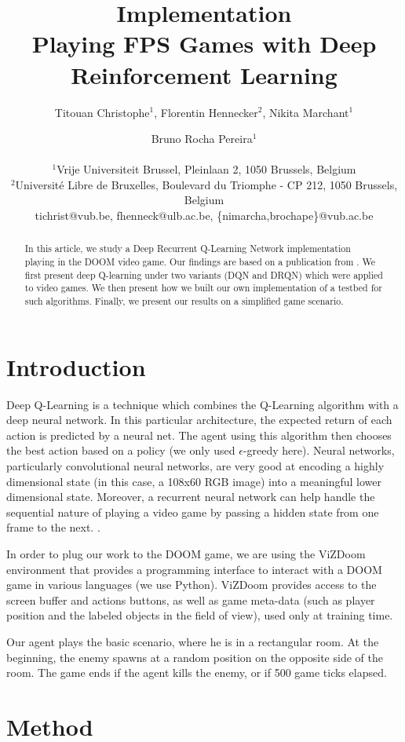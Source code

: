 \documentclass[letterpaper]{article}
\title{Implementation\\Playing FPS Games with Deep Reinforcement Learning}
\author{Titouan Christophe$^{1}$, Florentin Hennecker$^{2}$, Nikita Marchant$^{1}$ \and Bruno Rocha Pereira$^{1}$ \\
\mbox{}\\
$^1$Vrije Universiteit Brussel, Pleinlaan 2, 1050 Brussels, Belgium \\
$^2$Universit\'e Libre de Bruxelles, Boulevard du Triomphe - CP 212, 1050
Brussels, Belgium \\
tichrist@vub.be, fhenneck@ulb.ac.be, \{nimarcha,brochape\}@vub.ac.be}
\begin{document}
\maketitle

\begin{abstract}
In this article, we study a Deep Recurrent Q-Learning Network implementation
playing in the DOOM video game. Our findings are based on a publication from
\cite{Lample2016}. We first present deep Q-learning under two variants (DQN and
DRQN) which were applied to video games. We then present how we built our own
implementation of a testbed for such algorithms. Finally, we present our results
on a simplified game scenario.
\end{abstract}

\section{Introduction}
Deep Q-Learning is a technique which combines the Q-Learning algorithm with
a deep neural network. In this particular architecture, the expected return of
each action is predicted by a neural net. The agent using this algorithm then
chooses the best action based on a policy (we only used $\epsilon$-greedy here).
Neural networks, particularly convolutional neural networks, are very good at
encoding a highly dimensional state (in this case, a 108x60 RGB image) into a
meaningful lower dimensional state. Moreover, a recurrent neural network can
help handle the sequential nature of playing a video game by passing a hidden
state from one frame to the next.
.

In order to plug our work to the DOOM game, we are using the ViZDoom environment
\citep{Kempka2016} that provides a programming interface to interact with a
DOOM game in various languages (we use Python). ViZDoom provides access to the
screen buffer and actions buttons, as well as game meta-data (such as player
position and the labeled objects in the field of view), used only at training time.

Our agent plays the basic scenario, where he is in a rectangular room.
At the beginning, the enemy spawns at a random position on the opposite side of
the room. The game ends if the agent kills the enemy, or if 500 game ticks elapsed.

\section{Method}
\end{document}
